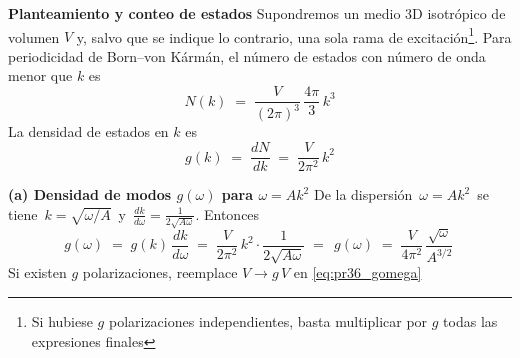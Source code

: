 \documentclass{article}
\begin{document}
\noindent\textbf{Planteamiento y conteo de estados}\;
Supondremos un medio 3D isotrópico de volumen $V$ y, salvo que se indique lo contrario, una sola rama de excitación\footnote{Si hubiese $g$ polarizaciones independientes, basta multiplicar por $g$ todas las expresiones finales}. Para periodicidad de Born–von Kármán, el número de estados con número de onda menor que $k$ es
\begin{equation}
  N(k) \;=\; \frac{V}{(2\pi)^3}\,\frac{4\pi}{3}\,k^3
  \label{eq:pr36_Nk}
\end{equation}
La densidad de estados en $k$ es
\begin{equation}
  g(k)\;=\;\frac{dN}{dk}\;=\;\frac{V}{2\pi^2}\,k^2
  \label{eq:pr36_gk}
\end{equation}

\noindent\textbf{(a) Densidad de modos $g(\omega)$ para $\omega=A k^2$}\;
De la dispersión $\,\omega=A k^2\,$ se tiene $\,k=\sqrt{\omega/A}\,$ y $\,\frac{dk}{d\omega}=\frac{1}{2\sqrt{A\omega}}$. Entonces
\begin{equation}
  g(\omega)\;=\;g(k)\,\frac{dk}{d\omega}
  \;=\;
  \frac{V}{2\pi^2}\,k^2 \cdot \frac{1}{2\sqrt{A\omega}}
  \;=\;
  \boxed{\,g(\omega)\;=\;\frac{V}{4\pi^2}\,\frac{\sqrt{\omega}}{A^{3/2}}\,}
  \label{eq:pr36_gomega}
\end{equation}
Si existen $g$ polarizaciones, reemplace $V\to g\,V$ en \eqref{eq:pr36_gomega}
\end{document}
